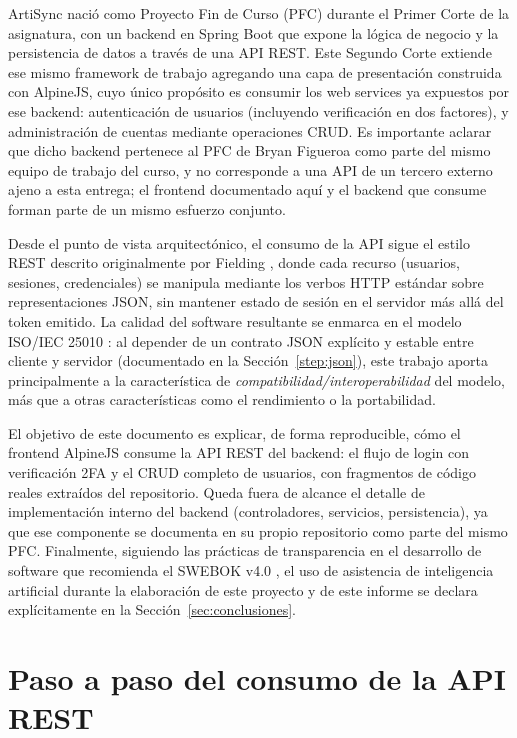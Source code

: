 \documentclass[12pt,a4paper]{article}
\begin{document}
ArtiSync nació como Proyecto Fin de Curso (PFC) durante el Primer Corte de la asignatura, con un backend en Spring Boot que expone la lógica de negocio y la persistencia de datos a través de una API REST. Este Segundo Corte extiende ese mismo framework de trabajo agregando una capa de presentación construida con AlpineJS, cuyo único propósito es consumir los web services ya expuestos por ese backend: autenticación de usuarios (incluyendo verificación en dos factores), y administración de cuentas mediante operaciones CRUD. Es importante aclarar que dicho backend pertenece al PFC de Bryan Figueroa como parte del mismo equipo de trabajo del curso, y no corresponde a una API de un tercero externo ajeno a esta entrega; el frontend documentado aquí y el backend que consume forman parte de un mismo esfuerzo conjunto.

Desde el punto de vista arquitectónico, el consumo de la API sigue el estilo REST descrito originalmente por Fielding \cite{fielding2000}, donde cada recurso (usuarios, sesiones, credenciales) se manipula mediante los verbos HTTP estándar sobre representaciones JSON, sin mantener estado de sesión en el servidor más allá del token emitido. La calidad del software resultante se enmarca en el modelo ISO/IEC 25010 \cite{iso25010}: al depender de un contrato JSON explícito y estable entre cliente y servidor (documentado en la Sección~\ref{step:json}), este trabajo aporta principalmente a la característica de \emph{compatibilidad/interoperabilidad} del modelo, más que a otras características como el rendimiento o la portabilidad.

El objetivo de este documento es explicar, de forma reproducible, cómo el frontend AlpineJS consume la API REST del backend: el flujo de login con verificación 2FA y el CRUD completo de usuarios, con fragmentos de código reales extraídos del repositorio. Queda fuera de alcance el detalle de implementación interno del backend (controladores, servicios, persistencia), ya que ese componente se documenta en su propio repositorio como parte del mismo PFC. Finalmente, siguiendo las prácticas de transparencia en el desarrollo de software que recomienda el SWEBOK v4.0 \cite{swebok2024}, el uso de asistencia de inteligencia artificial durante la elaboración de este proyecto y de este informe se declara explícitamente en la Sección~\ref{sec:conclusiones}.

\section{Paso a paso del consumo de la API REST}
\end{document}
